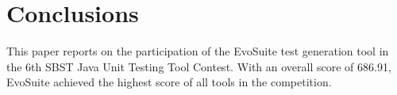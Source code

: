 \documentclass[sigconf,table]{acmart}
\newcommand{\EVOSUITE}{{\sc EvoSuite}\xspace}
\newcommand{\TOTALPOINTS}{{686.91}\xspace}
\begin{document}




\section{Conclusions}

This paper reports on the participation of the \EVOSUITE test
generation tool in the 6th SBST Java Unit Testing Tool Contest. With
an overall score of \TOTALPOINTS, \EVOSUITE achieved the highest score
of all tools in the competition.
\end{document}
